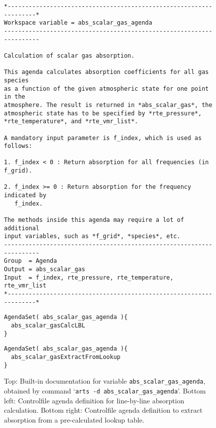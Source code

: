 \begin{figure}
\begin{lstlisting}
*-------------------------------------------------------------------*
Workspace variable = abs_scalar_gas_agenda
---------------------------------------------------------------------

Calculation of scalar gas absorption.

This agenda calculates absorption coefficients for all gas species 
as a function of the given atmospheric state for one point in the 
atmosphere. The result is returned in *abs_scalar_gas*, the 
atmospheric state has to be specified by *rte_pressure*, 
*rte_temperature*, and *rte_vmr_list*.

A mandatory input parameter is f_index, which is used as follows:

1. f_index < 0 : Return absorption for all frequencies (in f_grid).

2. f_index >= 0 : Return absorption for the frequency indicated by
   f_index. 

The methods inside this agenda may require a lot of additional
input variables, such as *f_grid*, *species*, etc.
---------------------------------------------------------------------
Group  = Agenda
Output = abs_scalar_gas
Input  = f_index, rte_pressure, rte_temperature, rte_vmr_list
*-------------------------------------------------------------------*
\end{lstlisting}
\begin{minipage}[t]{0.48\hsize}
\begin{lstlisting}
AgendaSet( abs_scalar_gas_agenda ){
  abs_scalar_gasCalcLBL
}
\end{lstlisting}
\end{minipage}
\hspace*{\fill}
\begin{minipage}[t]{0.48\hsize}
\begin{lstlisting}
AgendaSet( abs_scalar_gas_agenda ){
  abs_scalar_gasExtractFromLookup
}
\end{lstlisting}
\end{minipage}
\caption{Top: Built-in documentation for variable
  \texttt{abs\_scalar\_gas\_agenda}, obtained by command `\texttt{arts -d
    abs\_scalar\_gas\_agenda}'. Bottom left: Controlfile agenda definition for
  line-by-line absorption calculation. Bottom right: Controlfile agenda
  definition to extract absorption from a pre-calculated lookup table.}
\label{fig:agendas}
\end{figure}


